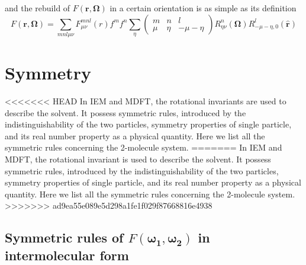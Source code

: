 and the rebuild of $F(\mathbf{r},\mathbf{\Omega})$ in a certain orientation
is as simple as its definition
\begin{equation}
F(\mathbf{r},\mathbf{\Omega})=\sum_{mnl\mu\nu}F_{\mu\nu}^{mnl}(r)f^{m}f^{n}\sum_{\eta}\left(\begin{array}{ccc}
m & n & l\\
\mu & \eta & -\mu-\eta
\end{array}\right)R_{\eta\nu}^{n}(\mathbf{\Omega})R_{-\mu-\eta,0}^{l}(\mathbf{\hat{r}})\label{eq:bwd-1}
\end{equation}



\section{Symmetry}

<<<<<<< HEAD
In IEM and MDFT, the rotational invariants are used to describe the
solvent. It possess symmetric rules, introduced by the indistinguishability
of the two particles, symmetry properties of single particle, and
its real number property as a physical quantity. Here we list all
the symmetric rules concerning the 2-molecule system.
=======
In IEM and MDFT, the rotational invariant is used to describe the
solvent. It possess symmetric rules, introduced by the indistinguishability
of the two particles, symmetry properties of single particle, and its
real number property as a physical quantity. Here we list all the symmetric
rules concerning the 2-molecule system.
>>>>>>> ad9ea55e089e5d298a1fe1f029f87668816e4938


\subsection{Symmetric rules of $F(\boldsymbol{\omega_{1}},\boldsymbol{\omega_{2}})$
in intermolecular form}

